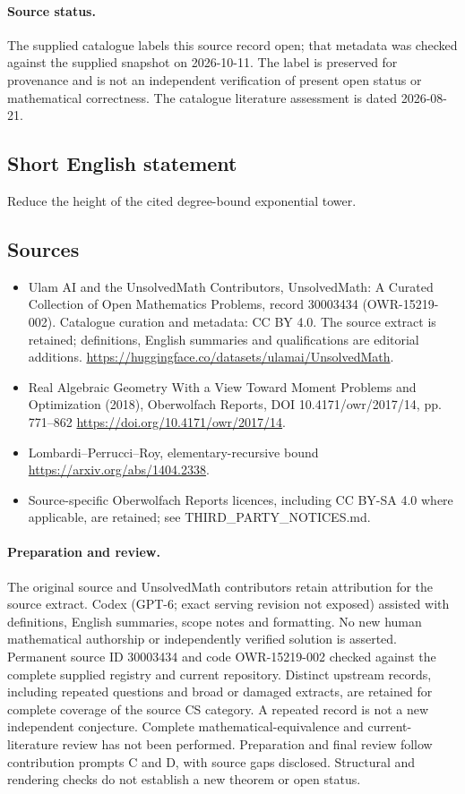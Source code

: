 \documentclass[11pt]{article}
\begin{document}
\paragraph{Source status.}
The supplied catalogue labels this source record open; that metadata was checked against the supplied snapshot on 2026-10-11. The label is preserved for provenance and is not an independent verification of present open status or mathematical correctness. The catalogue literature assessment is dated 2026-08-21.
\subsection{Short English statement}
Reduce the height of the cited degree-bound exponential tower.
\subsection{Sources}
\begin{itemize}
\item[S1] Ulam AI and the UnsolvedMath Contributors, UnsolvedMath: A Curated Collection of Open Mathematics Problems, record 30003434 (OWR-15219-002). Catalogue curation and metadata: CC BY 4.0. The source extract is retained; definitions, English summaries and qualifications are editorial additions.
\url{https://huggingface.co/datasets/ulamai/UnsolvedMath}.
\item[S2] Real Algebraic Geometry With a View Toward Moment Problems and Optimization (2018), Oberwolfach Reports, DOI 10.4171/owr/2017/14, pp. 771--862
\url{https://doi.org/10.4171/owr/2017/14}.
\item[S3] Lombardi--Perrucci--Roy, elementary-recursive bound
\url{https://arxiv.org/abs/1404.2338}.
\item Source-specific Oberwolfach Reports licences, including CC BY-SA 4.0 where applicable, are retained; see THIRD\_PARTY\_NOTICES.md.
\end{itemize}
\paragraph{Preparation and review.}
The original source and UnsolvedMath contributors retain attribution for the source extract. Codex (GPT-6; exact serving revision not exposed) assisted with definitions, English summaries, scope notes and formatting. No new human mathematical authorship or independently verified solution is asserted. Permanent source ID 30003434 and code OWR-15219-002 checked against the complete supplied registry and current repository. Distinct upstream records, including repeated questions and broad or damaged extracts, are retained for complete coverage of the source CS category. A repeated record is not a new independent conjecture. Complete mathematical-equivalence and current-literature review has not been performed. Preparation and final review follow contribution prompts C and D, with source gaps disclosed. Structural and rendering checks do not establish a new theorem or open status.
\label{end:30003434}
\end{document}
